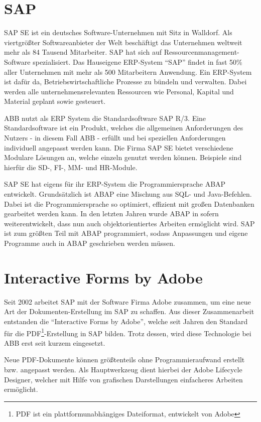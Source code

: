 \section{SAP}
SAP SE ist ein deutsches Software-Unternehmen mit Sitz in Walldorf. Als viertgrößter Softwareanbieter der Welt beschäftigt das Unternehmen weltweit mehr als 84 Tausend Mitarbeiter. SAP hat sich auf Ressourcenmanagement-Software spezialisiert. Das Hauseigene \ac{ERP}-System "`SAP"' findet in fast 50\% aller Unternehmen mit mehr als 500 Mitarbeitern Anwendung. Ein \ac{ERP}-System ist dafür da, Betriebswirtschaftliche Prozesse zu bündeln und verwalten. Dabei werden alle unternehmensrelevanten Ressourcen wie Personal, Kapital und Material geplant sowie gesteuert. 

ABB nutzt als \ac{ERP} System die Standardsoftware SAP R/3. Eine Standardsoftware ist ein Produkt, welches die allgemeinen Anforderungen des Nutzers - in diesem Fall ABB - erfüllt und bei speziellen Anforderungen individuell angepasst werden kann. Die Firma SAP SE bietet verschiedene Modulare Lösungen an, welche einzeln genutzt werden können. Beispiele sind hierfür die \ac{SD}-, \ac{FI}-, \ac{MM}- und \ac{HR}-Module. 

SAP SE hat eigens für ihr \ac{ERP}-System die Programmiersprache \ac{ABAP} entwickelt. Grundsätzlich ist \ac{ABAP} eine Mischung aus \ac{SQL}- und Java-Befehlen. Dabei ist  die Programmiersprache so optimiert, effizient mit großen Datenbanken gearbeitet werden kann. In den letzten Jahren wurde \ac{ABAP} in sofern weiterentwickelt, dass nun auch objektorientiertes Arbeiten ermöglicht wird. SAP ist zum größten Teil mit \ac{ABAP} programmiert, sodass Anpassungen und eigene Programme auch in \ac{ABAP} geschrieben werden müssen. 




\section{Interactive Forms by Adobe}

Seit 2002 arbeitet SAP mit der Software Firma Adobe zusammen, um eine neue Art der Dokumenten-Erstellung im SAP zu schaffen. Aus dieser Zusammenarbeit entstanden die "`Interactive Forms by Adobe"', welche seit Jahren den Standard für die PDF\footnote{\ac{PDF} ist ein plattformunabhängiges Dateiformat, entwickelt von Adobe}-Erstellung in SAP bilden. Trotz dessen, wird diese Technologie bei ABB erst seit kurzem eingesetzt.

Neue PDF-Dokumente können größtenteils ohne Programmieraufwand erstellt bzw. angepasst werden. Als Hauptwerkzeug dient hierbei der Adobe Lifecycle Designer, welcher mit Hilfe von grafischen Darstellungen einfacheres Arbeiten ermöglicht.

